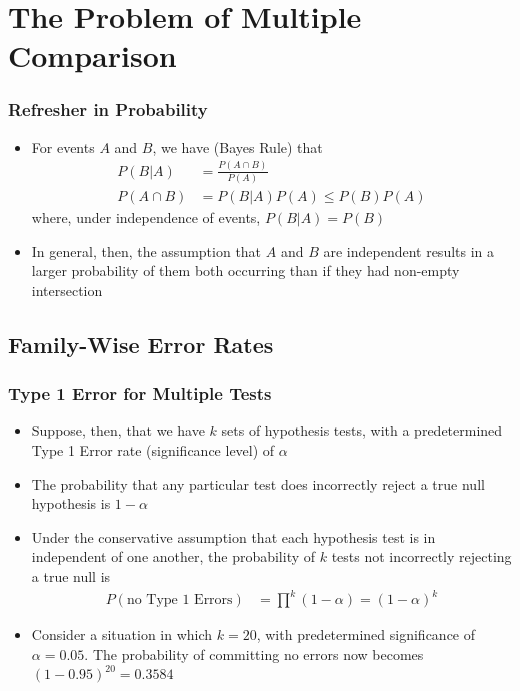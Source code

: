 \documentclass[11pt]{beamer}
\begin{document}
\section{The Problem of Multiple Comparison}

\begin{frame}
\frametitle{Refresher in Probability}
{
\begin{itemize}
\item For events $A$ and $B$, we have (Bayes Rule) that
\begin{align*}
P(B|A) &= \frac{P(A \cap B)}{P(A)} \\[6pt]
P(A \cap B) &= P(B|A)P(A) \leq P(B)P(A)
\end{align*}
where, under independence of events, $P(B|A) = P(B)$ \\
\item In general, then, the assumption that $A$ and $B$ are independent results in a larger probability of them both occurring than if they had non-empty intersection
\end{itemize}
}
\end{frame}

\subsection{Family-Wise Error Rates}

\begin{frame}
\frametitle{Type 1 Error for Multiple Tests}
{
\begin{itemize}
\item Suppose, then, that we have $k$ sets of hypothesis tests, with a predetermined Type 1 Error rate (significance level) of $\alpha$ \\
\item The probability that any particular test does incorrectly reject a true null hypothesis is $1 - \alpha$ \\
\item Under the conservative assumption that each hypothesis test is in independent of one another, the probability of $k$ tests not incorrectly rejecting a true null is
\begin{align*}
P(\text{no Type 1 Errors}) &= \prod^k (1 - \alpha) = (1-\alpha)^k
\end{align*}
\item Consider a situation in which $k = 20$, with predetermined significance of $\alpha = 0.05$. The probability of committing no errors now becomes $(1 - 0.95)^{20} = 0.3584$ \\
\end{itemize}
}
\end{frame}
\end{document}
